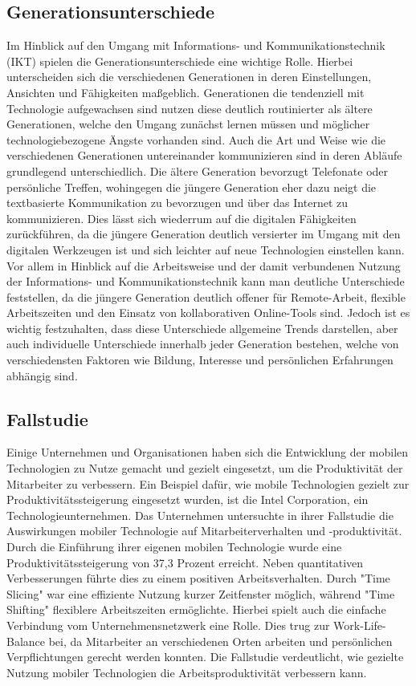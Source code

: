 \documentclass[12pt,a4paper]{article}
\begin{document}
\subsection*{Generationsunterschiede}
Im Hinblick auf den Umgang mit Informations- und Kommunikationstechnik (IKT) spielen die Generationsunterschiede eine wichtige Rolle. Hierbei unterscheiden sich die verschiedenen Generationen in deren Einstellungen, Ansichten und Fähigkeiten maßgeblich. Generationen die tendenziell mit Technologie aufgewachsen sind nutzen diese deutlich routinierter als ältere Generationen, welche den Umgang zunächst lernen müssen und möglicher technologiebezogene Ängste vorhanden sind. Auch die Art und Weise wie die verschiedenen Generationen untereinander kommunizieren sind in deren Abläufe grundlegend unterschiedlich. Die ältere Generation bevorzugt Telefonate oder persönliche Treffen, wohingegen die jüngere Generation eher dazu neigt die textbasierte Kommunikation zu bevorzugen und über das Internet zu kommunizieren. Dies lässt sich wiederrum auf die digitalen Fähigkeiten zurückführen, da die jüngere Generation deutlich versierter im Umgang mit den digitalen Werkzeugen ist und sich leichter auf neue Technologien einstellen kann. Vor allem in Hinblick auf die Arbeitsweise und der damit verbundenen Nutzung der Informations- und Kommunikationstechnik kann man deutliche Unterschiede feststellen, da die jüngere Generation deutlich offener für Remote-Arbeit, flexible Arbeitszeiten und den Einsatz von kollaborativen Online-Tools sind. Jedoch ist es wichtig festzuhalten, dass diese Unterschiede allgemeine Trends darstellen, aber auch individuelle Unterschiede innerhalb jeder Generation bestehen, welche von verschiedensten Faktoren wie Bildung, Interesse und persönlichen Erfahrungen abhängig sind.

\subsection*{Fallstudie}
Einige Unternehmen und Organisationen haben sich die Entwicklung der mobilen Technologien zu Nutze gemacht und gezielt eingesetzt, um die Produktivität der Mitarbeiter zu verbessern. Ein Beispiel dafür, wie mobile Technologien gezielt zur Produktivitätssteigerung eingesetzt wurden, ist die Intel Corporation, ein Technologieunternehmen. Das Unternehmen untersuchte in ihrer Fallstudie die Auswirkungen mobiler Technologie auf Mitarbeiterverhalten und -produktivität. Durch die Einführung ihrer eigenen mobilen Technologie wurde eine Produktivitätssteigerung von 37,3 Prozent erreicht. Neben quantitativen Verbesserungen führte dies zu einem positiven Arbeitsverhalten. Durch "Time Slicing" war eine effiziente Nutzung kurzer Zeitfenster möglich, während "Time Shifting" flexiblere Arbeitszeiten ermöglichte. Hierbei spielt auch die einfache Verbindung vom Unternehmensnetzwerk eine Rolle. Dies trug zur Work-Life-Balance bei, da Mitarbeiter an verschiedenen Orten arbeiten und persönlichen Verpflichtungen gerecht werden konnten. Die Fallstudie verdeutlicht, wie gezielte Nutzung mobiler Technologien die Arbeitsproduktivität verbessern kann. 
\end{document}
